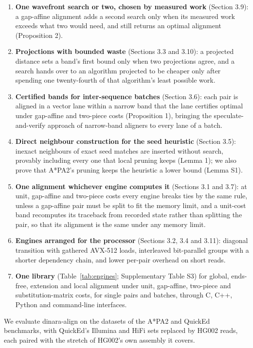 \documentclass[nocrop,noinfo]{bioinfo}
\begin{document}
\begin{enumerate}
  \item \textbf{One wavefront search or two, chosen by measured work} (Section 3.9): a gap-affine alignment adds a second search only when its measured work exceeds what two would need, and still returns an optimal alignment (Proposition 2).
  \item \textbf{Projections with bounded waste} (Sections 3.3 and 3.10): a projected distance sets a band's first bound only when two projections agree, and a search hands over to an algorithm projected to be cheaper only after spending one twenty-fourth of that algorithm's least possible work.
  \item \textbf{Certified bands for inter-sequence batches} (Section 3.6): each pair is aligned in a vector lane within a narrow band that the lane certifies optimal under gap-affine and two-piece costs (Proposition 1), bringing the speculate-and-verify approach of narrow-band aligners \citep{Gibrat2018band,Fujiki2020seedex} to every lane of a batch.
  \item \textbf{Direct neighbour construction for the seed heuristic} (Section 3.5): inexact neighbours of exact seed matches are inserted without search, provably including every one that local pruning keeps (Lemma 1); we also prove that A*PA2's pruning keeps the heuristic a lower bound (Lemma S1).
  \item \textbf{One alignment whichever engine computes it} (Sections 3.1 and 3.7): at unit, gap-affine and two-piece costs every engine breaks ties by the same rule, unless a gap-affine pair must be split to fit the memory limit, and a unit-cost band recomputes its traceback from recorded state rather than splitting the pair, so that its alignment is the same under any memory limit.
  \item \textbf{Engines arranged for the processor} (Sections 3.2, 3.4 and 3.11): diagonal transition with gathered AVX-512 loads, interleaved bit-parallel groups with a shorter dependency chain, and lower per-pair overhead on short reads.
  \item \textbf{One library} (Table~\ref{tab:engines}; Supplementary Table S3) for global, ends-free, extension and local alignment under unit, gap-affine, two-piece and substitution-matrix costs, for single pairs and batches, through C, C++, Python and command-line interfaces.
\end{enumerate}

We evaluate dinara-align on the datasets of the A*PA2 and QuickEd benchmarks, with QuickEd's Illumina and HiFi sets replaced by HG002 reads, each paired with the stretch of HG002's own assembly it covers.
\end{document}
